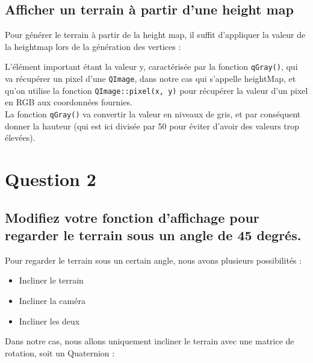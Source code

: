 \documentclass[a4paper,11pt]{report}
\begin{document}
    \subsection{Afficher un terrain à partir d'une height map}
    Pour générer le terrain à partir de la height map, il suffit d'appliquer la valeur de la heightmap lors de la génération des vertices :
        
	L'élément important étant la valeur y, caractérisée par la fonction \texttt{qGray()}, qui va récupérer un pixel d'une \texttt{QImage}, dans notre cas qui s'appelle heightMap, et qu'on utilise la fonction \texttt{QImage::pixel(x, y)} pour récupérer la valeur d'un pixel en RGB aux coordonnées fournies.\\
	La fonction \texttt{qGray()} va convertir la valeur en niveaux de gris, et par conséquent donner la hauteur (qui est ici divisée par 50 pour éviter d'avoir des valeurs trop élevées).
	
	\pagebreak
	\section{Question 2}
	\subsection{Modifiez votre fonction d'affichage pour regarder le terrain sous un angle de 45 degrés.}
		Pour regarder le terrain sous un certain angle, nous avons plusieurs possibilités :
		\begin{itemize}
			\item Incliner le terrain
			\item Incliner la caméra
			\item Incliner les deux
		\end{itemize}
		
		Dans notre cas, nous allons uniquement incliner le terrain avec une matrice de rotation, soit un Quaternion :
		
    	
\end{document}
